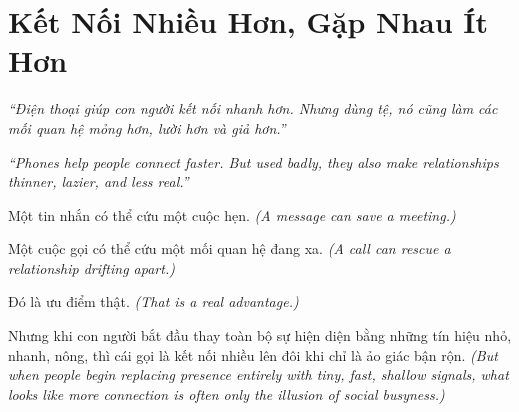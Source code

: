 \chapter{Kết Nối Nhiều Hơn, Gặp Nhau Ít Hơn}

\begin{center}
	\textit{\color{bookprimary}``Điện thoại giúp con người kết nối nhanh hơn. Nhưng dùng tệ, nó cũng làm các mối quan hệ mỏng hơn, lười hơn và giả hơn.''}

	\textit{\color{bookprimary}``Phones help people connect faster. But used badly, they also make relationships thinner, lazier, and less real.''}
\end{center}

\ngancach

\begin{tcolorbox}[colback=bookprimary!6,colframe=bookprimary!35,arc=5pt,title={\bfseries Góc Suy Nghĩ},fonttitle=\bfseries\color{bookprimary}]
Một tin nhắn có thể cứu một cuộc hẹn.
\textit{(A message can save a meeting.)}

Một cuộc gọi có thể cứu một mối quan hệ đang xa.
\textit{(A call can rescue a relationship drifting apart.)}

Đó là ưu điểm thật.
\textit{(That is a real advantage.)}

Nhưng khi con người bắt đầu thay toàn bộ sự hiện diện bằng những tín hiệu nhỏ, nhanh, nông, thì cái gọi là kết nối nhiều lên đôi khi chỉ là ảo giác bận rộn.
\textit{(But when people begin replacing presence entirely with tiny, fast, shallow signals, what looks like more connection is often only the illusion of social busyness.)}
\end{tcolorbox}


